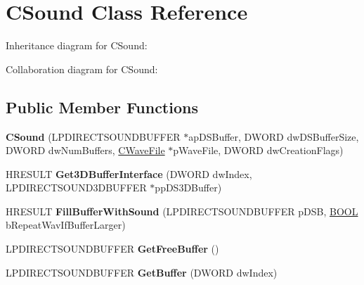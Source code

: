 \hypertarget{class_c_sound}{\section{C\+Sound Class Reference}
\label{class_c_sound}
}


Inheritance diagram for C\+Sound\+:


Collaboration diagram for C\+Sound\+:
\subsection*{Public Member Functions}
\begin{DoxyCompactItemize}
\item 
\hypertarget{class_c_sound_aa9aaa0a90651513608392e520a19bedf}{{\bfseries C\+Sound} (L\+P\+D\+I\+R\+E\+C\+T\+S\+O\+U\+N\+D\+B\+U\+F\+F\+E\+R $\ast$ap\+D\+S\+Buffer, D\+W\+O\+R\+D dw\+D\+S\+Buffer\+Size, D\+W\+O\+R\+D dw\+Num\+Buffers, \hyperlink{class_c_wave_file}{C\+Wave\+File} $\ast$p\+Wave\+File, D\+W\+O\+R\+D dw\+Creation\+Flags)}\label{class_c_sound_aa9aaa0a90651513608392e520a19bedf}

\item 
\hypertarget{class_c_sound_a8cc12b7a0c95af64112dd511b93fff79}{H\+R\+E\+S\+U\+L\+T {\bfseries Get3\+D\+Buffer\+Interface} (D\+W\+O\+R\+D dw\+Index, L\+P\+D\+I\+R\+E\+C\+T\+S\+O\+U\+N\+D3\+D\+B\+U\+F\+F\+E\+R $\ast$pp\+D\+S3\+D\+Buffer)}\label{class_c_sound_a8cc12b7a0c95af64112dd511b93fff79}

\item 
\hypertarget{class_c_sound_a5591cb7ebe3a9cb04e2a57fba3462510}{H\+R\+E\+S\+U\+L\+T {\bfseries Fill\+Buffer\+With\+Sound} (L\+P\+D\+I\+R\+E\+C\+T\+S\+O\+U\+N\+D\+B\+U\+F\+F\+E\+R p\+D\+S\+B, \hyperlink{_ice_types_8h_a050c65e107f0c828f856a231f4b4e788}{B\+O\+O\+L} b\+Repeat\+Wav\+If\+Buffer\+Larger)}\label{class_c_sound_a5591cb7ebe3a9cb04e2a57fba3462510}

\item 
\hypertarget{class_c_sound_a270ce46e674cb5f39fecfbbee8f45b41}{L\+P\+D\+I\+R\+E\+C\+T\+S\+O\+U\+N\+D\+B\+U\+F\+F\+E\+R {\bfseries Get\+Free\+Buffer} ()}\label{class_c_sound_a270ce46e674cb5f39fecfbbee8f45b41}

\item 
\hypertarget{class_c_sound_a74133e53b2e5393eef4048036c9d2d61}{L\+P\+D\+I\+R\+E\+C\+T\+S\+O\+U\+N\+D\+B\+U\+F\+F\+E\+R {\bfseries Get\+Buffer} (D\+W\+O\+R\+D dw\+Index)}\label{class_c_sound_a74133e53b2e5393eef4048036c9d2d61}


\end{DoxyCompactItemize}
